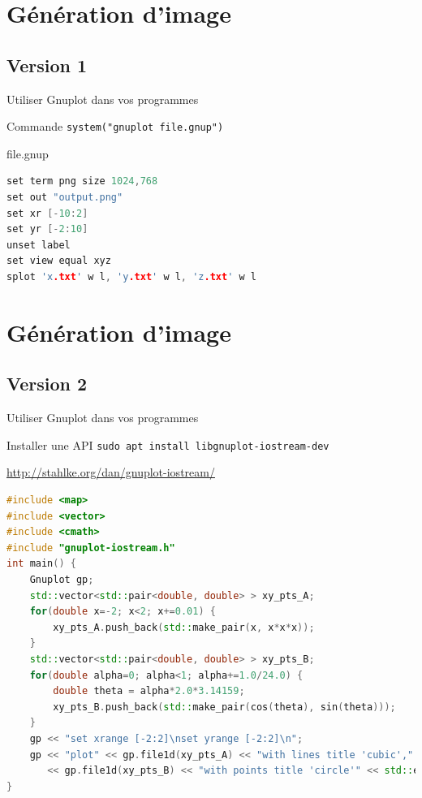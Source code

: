 \documentclass{beamer}
\begin{document}
\section{Génération d'image}
\subsection{Version 1}
\begin{frame}[fragile]{Utiliser Gnuplot dans vos programmes}
\begin{block}{Commande}
\verb?system("gnuplot file.gnup")?
\end{block}

\begin{block}{file.gnup}
  \begin{lstlisting}[language=C++]
set term png size 1024,768
set out "output.png"
set xr [-10:2]
set yr [-2:10]
unset label
set view equal xyz
splot 'x.txt' w l, 'y.txt' w l, 'z.txt' w l
\end{lstlisting}
\end{block}
\end{frame}

\section{Génération d'image}
\subsection{}
\subsection{Version 2}
\begin{frame}[fragile]{Utiliser Gnuplot dans vos programmes}
\begin{block}{Installer une API}
\verb?sudo apt install libgnuplot-iostream-dev?
\end{block}

\begin{block}{\url{http://stahlke.org/dan/gnuplot-iostream/}}
\tiny
  \begin{lstlisting}[language=C++]
#include <map>
#include <vector>
#include <cmath>
#include "gnuplot-iostream.h"
int main() {
	Gnuplot gp;
	std::vector<std::pair<double, double> > xy_pts_A;
	for(double x=-2; x<2; x+=0.01) {
		xy_pts_A.push_back(std::make_pair(x, x*x*x));
	}
	std::vector<std::pair<double, double> > xy_pts_B;
	for(double alpha=0; alpha<1; alpha+=1.0/24.0) {
		double theta = alpha*2.0*3.14159;
		xy_pts_B.push_back(std::make_pair(cos(theta), sin(theta)));
	}
	gp << "set xrange [-2:2]\nset yrange [-2:2]\n";
	gp << "plot" << gp.file1d(xy_pts_A) << "with lines title 'cubic',"
	   << gp.file1d(xy_pts_B) << "with points title 'circle'" << std::endl;
}
\end{lstlisting}
\end{block}
\end{frame}


\end{document}
